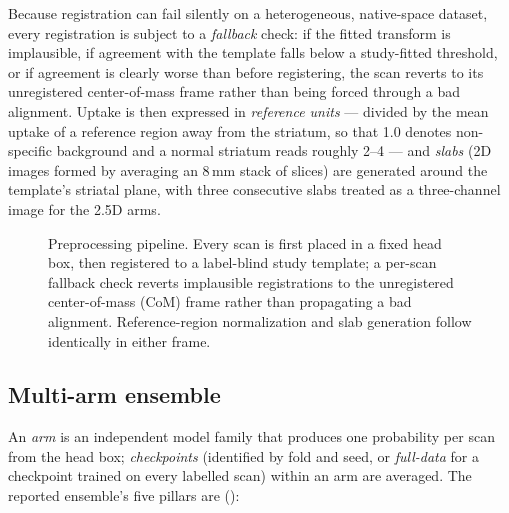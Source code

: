 \documentclass[10pt]{article}
\begin{document}
Because registration can fail silently on a heterogeneous, native-space dataset, every registration is subject to a \emph{fallback} check: if the fitted transform is implausible, if agreement with the template falls below a study-fitted threshold, or if agreement is clearly worse than before registering, the scan reverts to its unregistered center-of-mass frame rather than being forced through a bad alignment. Uptake is then expressed in \emph{reference units} --- divided by the mean uptake of a reference region away from the striatum, so that 1.0 denotes non-specific background and a normal striatum reads roughly 2--4 --- and \emph{slabs} (2D images formed by averaging an 8\,mm stack of slices) are generated around the template's striatal plane, with three consecutive slabs treated as a three-channel image for the 2.5D arms.

\begin{figure}[t]
\centering
\resizebox{\textwidth}{!}{}
\caption{Preprocessing pipeline. Every scan is first placed in a fixed head box, then registered to a label-blind study template; a per-scan fallback check reverts implausible registrations to the unregistered center-of-mass (CoM) frame rather than propagating a bad alignment. Reference-region normalization and slab generation follow identically in either frame.}
\label{fig:preprocessing}
\end{figure}

\subsection{Multi-arm ensemble}
\label{sec:ensemble}

An \emph{arm} is an independent model family that produces one probability per scan from the head box; \emph{checkpoints} (identified by fold and seed, or \emph{full-data} for a checkpoint trained on every labelled scan) within an arm are averaged. The reported ensemble's five pillars are ():
\end{document}
